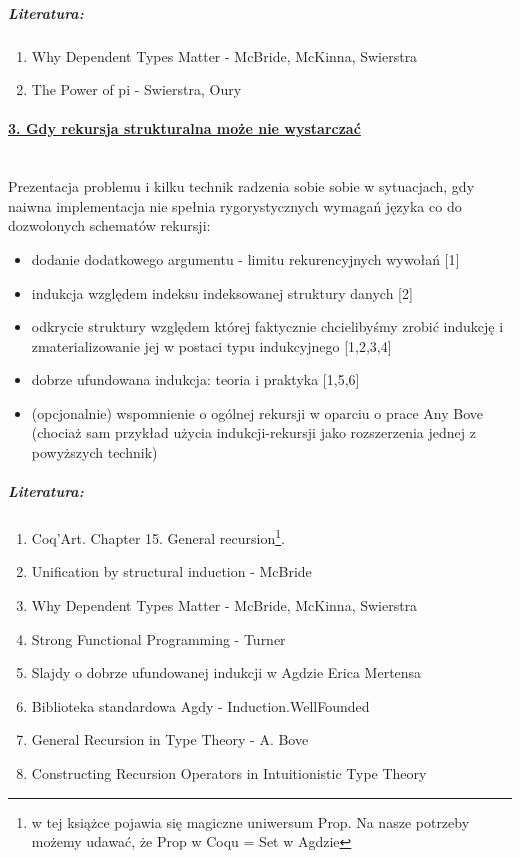 \documentclass[10pt, a4paper]{article}
\begin{document}
\subparagraph{Literatura:}

\begin{enumerate}
\addtolength{\itemsep}{-0.5\baselineskip}

 \item Why Dependent Types Matter - McBride, McKinna, Swierstra
 \item The Power of pi - Swierstra, Oury
\end{enumerate}

\paragraph{\underline{3. Gdy rekursja strukturalna może nie wystarczać}}
~ \\

Prezentacja problemu i kilku technik radzenia sobie sobie w sytuacjach, gdy naiwna implementacja nie spełnia rygorystycznych wymagań języka co do dozwolonych schematów rekursji:

\begin{itemize}
\addtolength{\itemsep}{-0.5\baselineskip}

 \item 
    dodanie dodatkowego argumentu - limitu rekurencyjnych wywołań [1]
 \item 
    indukcja względem indeksu indeksowanej struktury danych [2]
 \item 
    odkrycie struktury względem której faktycznie chcielibyśmy zrobić indukcję i zmaterializowanie jej w postaci typu indukcyjnego [1,2,3,4]
 \item 
    dobrze ufundowana indukcja: teoria i praktyka [1,5,6]
 \item 
    (opcjonalnie) wspomnienie o ogólnej rekursji w oparciu o prace Any Bove (chociaż sam przykład użycia indukcji-rekursji jako rozszerzenia jednej z powyższych technik)

\end{itemize}

\subparagraph{Literatura:}

\begin{enumerate}
\addtolength{\itemsep}{-0.5\baselineskip}

 \item
     Coq’Art. Chapter 15. General recursion\footnote{w tej książce pojawia się magiczne uniwersum Prop. Na nasze potrzeby możemy udawać, że Prop w Coqu = Set w Agdzie}.

\item
    Unification by structural induction - McBride
\item
    Why Dependent Types Matter - McBride, McKinna, Swierstra
\item
    Strong Functional Programming - Turner
\item
    Slajdy o dobrze ufundowanej indukcji w Agdzie Erica Mertensa
\item
    Biblioteka standardowa Agdy - Induction.WellFounded
\item
    General Recursion in Type Theory - A. Bove
\item
    Constructing Recursion Operators in Intuitionistic Type Theory
 
\end{enumerate}
\end{document}
